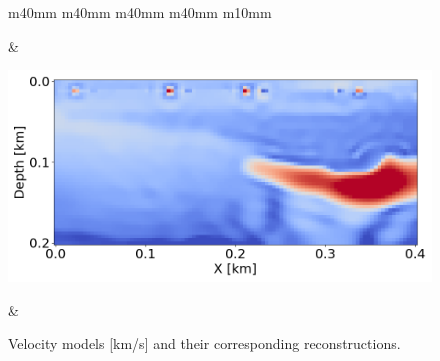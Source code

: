 \begin{figure}[htbp]
\begin{tabular}{m{40mm} m{40mm} m{40mm} m{40mm} m{10mm}}
\begin{minipage}[b]{\linewidth}
            \vspace{-7mm}
            \caption*{Proposed, $\alpha = 350$}
            \vspace{1mm}
        \end{minipage} &
        \hspace{-15mm}
        \begin{minipage}[b]{\linewidth}
            \centering
            \includegraphics[width=\linewidth]{public/alpha_550}
            \vspace{-7mm}
            \caption*{Proposed, $\alpha = 550$}
            \vspace{1mm}
        \end{minipage} &
        \hspace{-18mm}
         \\
    \end{tabular}
    \vspace{-3mm}
    \caption{Velocity models [km/s] and their corresponding reconstructions.}
    \label{fig:velocity-models-pure}
\end{figure}
